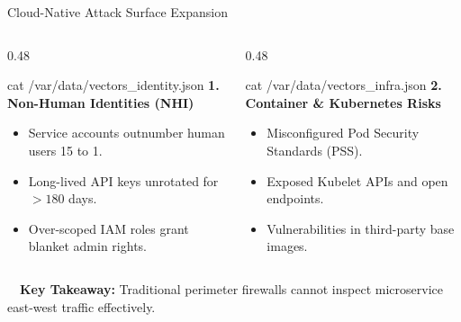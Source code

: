 \documentclass[aspectratio=169, 10pt]{beamer}
\begin{document}
\begin{frame}{Cloud-Native Attack Surface Expansion}
  \begin{columns}[T]
    \begin{column}{0.48\textwidth}
      \begin{terminalbox}{cat /var/data/vectors\_identity.json}
        {\ttfamily\color{cybercyan}\bfseries 1. Non-Human Identities (NHI)}
        \begin{itemize}
          \item Service accounts outnumber human users 15 to 1.
          \item Long-lived API keys unrotated for $>180$ days.
          \item Over-scoped IAM roles grant blanket admin rights.
        \end{itemize}
      \end{terminalbox}
    \end{column}
    \begin{column}{0.48\textwidth}
      \begin{terminalbox}{cat /var/data/vectors\_infra.json}
        {\ttfamily\color{cyberamber}\bfseries 2. Container \& Kubernetes Risks}
        \begin{itemize}
          \item Misconfigured Pod Security Standards (PSS).
          \item Exposed Kubelet APIs and open endpoints.
          \item Vulnerabilities in third-party base images.
        \end{itemize}
      \end{terminalbox}
    \end{column}
  \end{columns}

  \vspace{4pt}
  \begin{tcolorbox}[colback=bgcard, colframe=borderdark, arc=3pt, left=7pt, right=7pt, top=3pt, bottom=3pt]
    {\small\color{cybercyan}\faKey\ \ \textbf{Key Takeaway:}} {\small Traditional perimeter firewalls cannot inspect microservice east-west traffic effectively.}
  \end{tcolorbox}
\end{frame}
\end{document}
